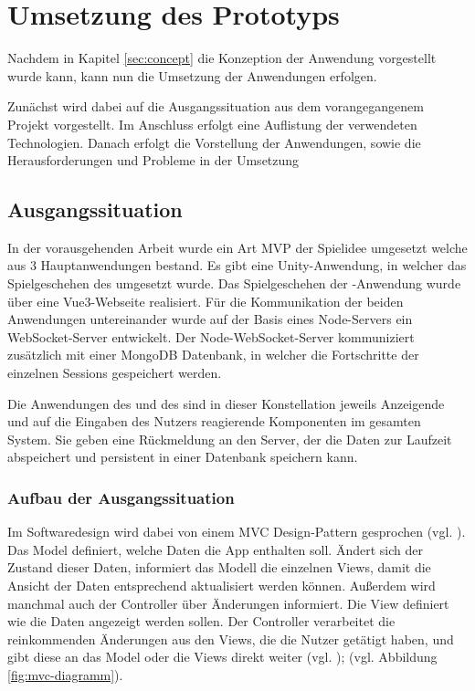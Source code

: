 \chapter{Umsetzung des Prototyps}
Nachdem in Kapitel \ref{sec:concept} die Konzeption der Anwendung vorgestellt wurde kann, kann nun die Umsetzung der Anwendungen erfolgen.

Zunächst wird dabei auf die Ausgangssituation aus dem vorangegangenem Projekt vorgestellt. Im Anschluss erfolgt eine Auflistung der verwendeten Technologien. Danach erfolgt die Vorstellung der Anwendungen, sowie die Herausforderungen und Probleme in der Umsetzung

\section{Ausgangssituation}
In der vorausgehenden Arbeit wurde ein Art \ac{MVP} der Spielidee umgesetzt welche aus 3 Hauptanwendungen bestand. Es gibt eine Unity-Anwendung, in welcher das Spielgeschehen des  umgesetzt wurde. Das Spielgeschehen der -Anwendung wurde über eine Vue3-Webseite realisiert. Für die Kommunikation der beiden Anwendungen untereinander wurde auf der Basis eines  Node-Servers ein WebSocket-Server entwickelt. Der Node-WebSocket-Server kommuniziert zusätzlich mit einer MongoDB Datenbank, in welcher die Fortschritte der einzelnen Sessions gespeichert werden.

Die Anwendungen des  und des  sind in dieser Konstellation jeweils Anzeigende und auf die Eingaben des Nutzers reagierende Komponenten im gesamten System. Sie geben eine Rückmeldung an den Server, der die Daten zur Laufzeit abspeichert und persistent in einer Datenbank speichern kann.

\subsection{Aufbau der Ausgangssituation}

Im Softwaredesign wird dabei von einem \ac{MVC} Design-Pattern gesprochen (vgl. \cite{GlossarWiki:Reenskaug:1979a}). 
Das Model definiert, welche Daten die App enthalten soll. Ändert sich der Zustand dieser Daten, informiert das Modell die einzelnen Views, damit die Ansicht der Daten entsprechend aktualisiert werden können. Außerdem wird manchmal auch der Controller über Änderungen informiert. Die View definiert wie die Daten angezeigt werden sollen. Der Controller verarbeitet die reinkommenden Änderungen aus den Views, die die Nutzer getätigt haben, und gibt diese an das Model oder die Views direkt weiter (vgl. \cite{noauthor_mvc_2023}); (vgl. Abbildung \ref{fig:mvc-diagramm}).

